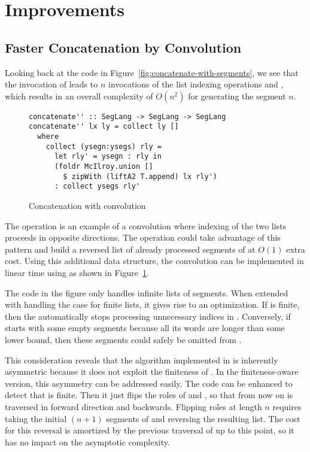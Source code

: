 \section{Improvements}
\label{sec:improvements}

\subsection{Faster Concatenation by Convolution}
\label{sec:faster-concatenation}
\label{sec:convolution}

Looking back at the code in
Figure~\ref{fig:concatenate-with-segments}, we see that the
invocation of  leads to $n$ invocations of the list
indexing operations  and , which
results in an  overall complexity of $O (n^2)$ for generating the
segment $n$.

\begin{figure}[tp]
\begin{lstlisting}
concatenate'' :: SegLang -> SegLang -> SegLang
concatenate'' lx ly = collect ly []
  where
    collect (ysegn:ysegs) rly =
      let rly' = ysegn : rly in
      (foldr McIlroy.union []
        $ zipWith (liftA2 T.append) lx rly')
      : collect ysegs rly'
\end{lstlisting}
  \caption{Concatenation with convolution}
  \label{fig:concatenation-with-convolution}
\end{figure}
The  operation is an example of a convolution where
indexing of the two lists proceeds in opposite directions. The  operation
could take advantage of this pattern and build a reversed list  of already
processed segments of  at $O(1)$ extra cost. Using this additional data structure, the
convolution can be implemented in linear time using
 as shown in Figure~\ref{fig:concatenation-with-convolution}.

The code in the figure only handles infinite lists of
segments. When extended with handling the case for finite lists,
it gives rise to an optimization. If  is finite,
then the  automatically stops processing unnecessary indices in
. Conversely, if  starts with some empty segments
because all its words are longer than some lower bound, then these
segments could safely be omitted from .

This consideration reveals that the algorithm implemented in
 is inherently asymmetric because it does not
exploit the finiteness of . In the finiteness-aware version, this asymmetry can be
addressed easily.  The code can be
enhanced to detect that  is finite. Then it just flips the roles of
 and , so that from now on  is traversed in 
forward direction and  backwards. Flipping roles at length $n$ requires taking
the initial $(n+1)$ segments of  and reversing the resulting
list. The cost for this reversal is amortized by the previous traversal of
 up to this point, so it has no impact on the asymptotic
complexity.

